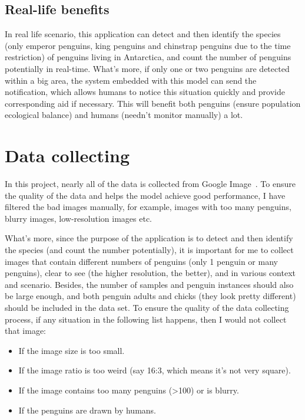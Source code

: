 \documentclass[runningheads]{llncs}
\begin{document}
\subsection{Real-life benefits}
In real life scenario, this application can detect and then identify the species (only emperor penguins, king penguins and chinstrap penguins due to the time restriction) of penguins living in Antarctica, and count the number of penguins potentially in real-time. What's more, if only one or two penguins are detected within a big area, the system embedded with this model can send the notification, which allows humans to notice this situation quickly and provide corresponding aid if necessary. This will benefit both penguins (ensure population ecological balance) and humans (needn't monitor manually) a lot.


\section{Data collecting}
In this project, nearly all of the data is collected from Google Image~\cite{ref_google_image}. To ensure the quality of the data and helps the model achieve good performance, I have filtered the bad images manually, for example, images with too many penguins, blurry images, low-resolution images etc.

What's more, since the purpose of the application is to detect and then identify the species (and count the number potentially), it is important for me to collect images that contain different numbers of penguins (only 1 penguin or many penguins), clear to see (the higher resolution, the better), and in various context and scenario. Besides, the number of samples and penguin instances should also be large enough, and both penguin adults and chicks (they look pretty different) should be included in the data set. To ensure the quality of the data collecting process, if any situation in the following list happens, then I would not collect that image:

\begin{itemize}
  \item If the image size is too small.
  \item If the image ratio is too weird (say 16:3, which means it's not very square).
  \item If the image contains too many penguins (\textgreater{100}) or is blurry.
  \item If the penguins are drawn by humans.
\end{itemize}
\end{document}
